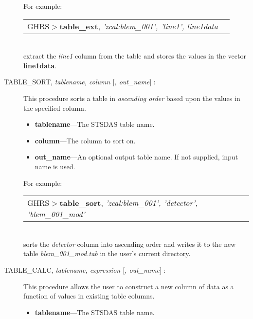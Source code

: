 \begin{description}
\noindent
For example:\\

\begin{tabular}{ll}
GHRS$>${\bf table\_ext}, {\it 'zcal:blem\_001', 'line1', line1data} & \\
\end{tabular}\\

\noindent
extract the {\it line1} column from the table and stores the values in the
vector {\bf line1data}.
%
\item [TABLE\_SORT, {\it tablename, column $[$, out\_name$]$} : ] 

This procedure sorts a table in {\it ascending order} based upon the values in the specified
column.

\begin{itemize}

\item {\bf tablename}---The STSDAS table name.

\item {\bf column}---The column to sort on.

\item {\bf out\_name}---An optional output table name.  If not 
supplied, input name is used.

\end{itemize}

\noindent
For example:\\

\begin{tabular}{ll}
GHRS$>${\bf table\_sort}, {\it 'zcal:blem\_001', 'detector', 'blem\_001\_mod'} & \\
\end{tabular}\\

\noindent
sorts the {\it detector} column into ascending order and writes it to the 
new table {\it blem\_001\_mod.tab} in the user's current directory.

\item [TABLE\_CALC, {\it tablename, expression $[$, out\_name$]$} :] 

This procedure allows the user to construct a new column of data
as a function of values in existing table columns.

\begin{itemize}

\item{\bf tablename}---The STSDAS table name.


\end{itemize}
\end{description}
